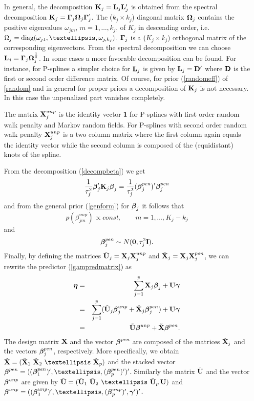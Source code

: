 \documentclass[11pt,a4paper,twoside]{bayesxarticle}
\begin{document}
In general, the decomposition $\mathbf{K}_j=\mathbf{L}_j\mathbf{L}_j'$ is obtained from the
spectral decomposition $\mathbf{K}_j = \boldsymbol{\Gamma}_j \boldsymbol{\Omega}_j \boldsymbol{\Gamma}_j'$. The
($k_j \times k_j$)  diagonal matrix $\boldsymbol{\Omega}_j$ contains the positive
eigenvalues $\omega_{jm}$, $m=1,\dots,k_j$, of $K_j$ in descending
order, i.e. $\Omega_j = \diag(\omega_{j1},\dots,\omega_{j,k_j})$.
$\boldsymbol{\Gamma}_j$ is a ($K_j \times k_j$) orthogonal matrix of the
corresponding eigenvectors. From the spectral decomposition we can
choose $\mathbf{L}_j = \boldsymbol{\Gamma}_j \boldsymbol{\Omega}_j^{\frac{1}{2}}$. In some cases a more
favorable decomposition can be found. For instance, for P-splines a
simpler choice for $\mathbf{L}_j$ is given by $\mathbf{L}_j = \mathbf{D}'$ where $\mathbf{D}$ is the
first or second order difference matrix. Of course, for  prior
(\ref{randomeff}) of \autoref{random} and in general for proper
priors a decomposition of $\mathbf{K}_j$ is not necessary. In this case the
unpenalized part vanishes completely.

The matrix $\mathbf{X}_j^{unp}$ is the identity vector {\bf 1} for P-splines
with first order random walk penalty and Markov random fields. For
P-splines with second order random walk penalty $\mathbf{X}_j^{unp}$ is a two
column matrix where the first column again equals the identity
vector while the second column is composed of the (equidistant)
knots of the spline.

From the decomposition (\ref{decompbeta}) we get
$$
\frac{1}{\tau^2_j} \boldsymbol{\beta}_j' \mathbf{K}_j \boldsymbol{\beta}_j = \frac{1}{\tau^2_j}
(\boldsymbol{\beta}_j^{pen})' \boldsymbol{\beta}_j^{pen}
$$
and from the general prior (\ref{genform}) for $\boldsymbol{\beta}_j$ it follows
that
$$
p(\beta_{jm}^{unp}) \propto const , \qquad m=1,\dots, K_j-k_j
$$
and
\begin{equation}
\label{priorunp} \betavec_j^{pen} \sim N(\nullvec,\tau_j^2 \Ivec).
\end{equation}
Finally, by defining the matrices $\tilde{\mathbf{U}}_j = \mathbf{X}_j \mathbf{X}_j^{unp}$
and $\tilde{\mathbf{X}}_j = \mathbf{X}_j \mathbf{X}_j^{pen}$, we can rewrite the predictor
(\ref{gampredmatrix}) as
\begin{eqnarray*}
\boldsymbol{\eta} &=& \sum_{j=1}^{p} \mathbf{X}_j \boldsymbol{\beta}_j  + \mathbf{U} \boldsymbol{\gamma}\\
     &=& \displaystyle \sum_{j=1}^{p}  (\tilde{\mathbf{U}}_j \boldsymbol{\beta}_j^{unp} + \tilde{\mathbf{X}}_j
     \boldsymbol{\beta}_j^{pen}) +  \mathbf{U} \boldsymbol{\gamma}\\
&=& \displaystyle \tilde{\mathbf{U}} \boldsymbol{\beta}^{unp} + \tilde{\mathbf{X}} \boldsymbol{\beta}^{pen}.
\end{eqnarray*}
The design matrix $\tilde{\mathbf{X}}$ and the vector $\boldsymbol{\beta}^{pen}$ are
composed of the matrices $\tilde{\mathbf{X}}_j$ and the vectors
$\boldsymbol{\beta}_j^{pen}$, respectively. More specifically, we obtain
$\tilde{\Xvec} = (\tilde{\Xvec}_1 \,\, \tilde{\Xvec}_2 \,\, \ldots \,\,
\tilde{\Xvec}_p) $ and the stacked vector $\betavec^{pen} =
((\betavec_1^{pen})',\dots,(\betavec_p^{pen})')'$. Similarly the matrix
$\tilde{\mathbf{U}}$ and the vector $\boldsymbol{\beta}^{unp}$ are given by $\tilde{\Uvec} =
(\tilde{\Uvec}_1 \,\, \tilde{\Uvec}_2 \,\, \ldots \,\, \tilde{\Uvec}_p \, \Uvec)$
and $\betavec^{unp} =
((\betavec_1^{unp})',\dots,(\betavec_p^{unp})',\gammavec')'$.
\end{document}
